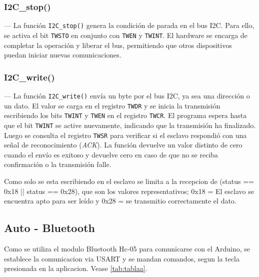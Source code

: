 \vspace{1em}
\subsubsection{I2C\_stop()} ---
La función \texttt{I2C\_stop()} genera la condición de parada en el bus I2C. Para ello, se activa el bit \texttt{TWSTO} en conjunto con \texttt{TWEN} y \texttt{TWINT}. El hardware se encarga de completar la operación y liberar el bus, permitiendo que otros dispositivos puedan iniciar nuevas comunicaciones.

\vspace{1em}
\subsubsection{I2C\_write()} ---
La función \texttt{I2C\_write()} envía un byte por el bus I2C, ya sea una dirección o un dato. El valor se carga en el registro \texttt{TWDR} y se inicia la transmisión escribiendo los bits \texttt{TWINT} y \texttt{TWEN} en el registro \texttt{TWCR}. El programa espera hasta que el bit \texttt{TWINT} se active nuevamente, indicando que la transmisión ha finalizado. Luego se consulta el registro \texttt{TWSR} para verificar si el esclavo respondió con una señal de reconocimiento (\textit{ACK}). La función devuelve un valor distinto de cero cuando el envío es exitoso y devuelve cero en caso de que no se reciba confirmación o la transmisión falle.

\vspace{1em}

Como solo se esta escribiendo en el esclavo se limita a la recepcion de (status == 0x18 || status == 0x28), que son los valores representativos; 0x18 = El esclavo se encuentra apto para ser leído y 0x28 = se transmitio correctamente el dato.





\subsection{Auto - Bluetooth}

Como se utiliza el modulo Bluetooth Hc-05 para comunicarse con el Arduino, se establece la comunicacion via USART y se mandan comandos, segun la tecla presionada en la aplicacion. Vease \ref{tab:tablaa}.

